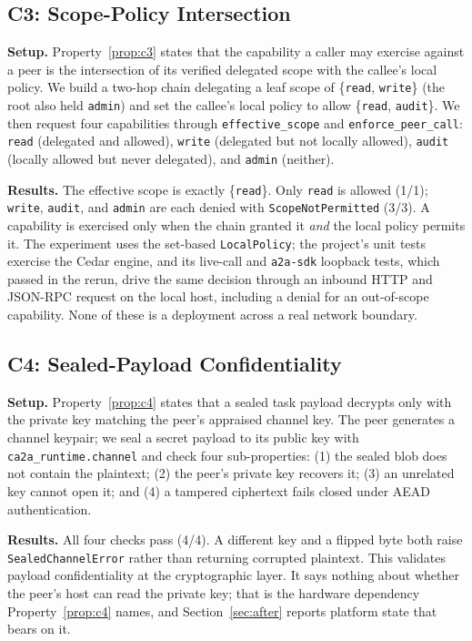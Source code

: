 \subsection{C3: Scope-Policy Intersection}
\label{sec:eval-c3}

\textbf{Setup.} Property~\ref{prop:c3} states that the capability a caller may exercise against a
peer is the intersection of its verified delegated scope with the callee's local policy. We build
a two-hop chain delegating a leaf scope of \{\texttt{read}, \texttt{write}\} (the root also held
\texttt{admin}) and set the callee's local policy to allow \{\texttt{read}, \texttt{audit}\}. We
then request four capabilities through \texttt{effective\_scope} and \texttt{enforce\_peer\_call}:
\texttt{read} (delegated and allowed), \texttt{write} (delegated but not locally allowed),
\texttt{audit} (locally allowed but never delegated), and \texttt{admin} (neither).

\textbf{Results.} The effective scope is exactly \{\texttt{read}\}. Only \texttt{read} is allowed
(1/1); \texttt{write}, \texttt{audit}, and \texttt{admin} are each denied with
\texttt{ScopeNotPermitted} (3/3). A capability is exercised only when the chain granted it
\emph{and} the local policy permits it. The experiment uses the set-based \texttt{LocalPolicy};
the project's unit tests exercise the Cedar engine, and its live-call and \texttt{a2a-sdk}
loopback tests, which passed in the rerun, drive the same decision through an inbound HTTP and
JSON-RPC request on the local host, including a denial for an out-of-scope capability. None of
these is a deployment across a real network boundary.

\subsection{C4: Sealed-Payload Confidentiality}
\label{sec:eval-c4}

\textbf{Setup.} Property~\ref{prop:c4} states that a sealed task payload decrypts only with the
private key matching the peer's appraised channel key. The peer generates a channel keypair; we
seal a secret payload to its public key with \texttt{ca2a\_runtime.channel} and check four
sub-properties: (1) the sealed blob does not contain the plaintext; (2) the peer's private key
recovers it; (3) an unrelated key cannot open it; and (4) a tampered ciphertext fails closed
under AEAD authentication.

\textbf{Results.} All four checks pass (4/4). A different key and a flipped byte both raise
\texttt{SealedChannelError} rather than returning corrupted plaintext. This validates payload
confidentiality at the cryptographic layer. It says nothing about whether the peer's host can read
the private key; that is the hardware dependency Property~\ref{prop:c4} names, and
Section~\ref{sec:after} reports platform state that bears on it.

